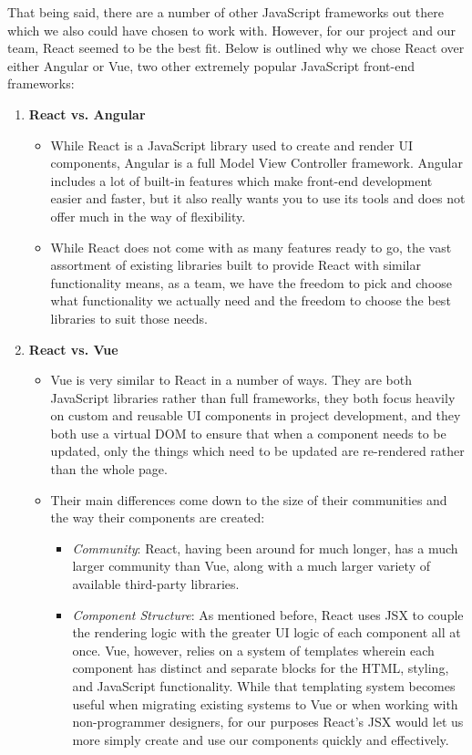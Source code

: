 \documentclass[titlepage, 12pt]{article}
\begin{document}
That being said, there are a number of other JavaScript frameworks out there which we also could have chosen to work with. However, for our project and our team, React seemed to be the best fit. Below is outlined why we chose React over either Angular or Vue, two other extremely popular JavaScript front-end frameworks:

\begin{enumerate}
    \item \textbf{React vs. Angular}
    \begin{itemize}
        \item While React is a JavaScript library used to create and render UI components, Angular is a full Model View Controller framework. Angular includes a lot of built-in features which make front-end development easier and faster, but it also really wants you to use its tools and does not offer much in the way of flexibility.
        \item While React does not come with as many features ready to go, the vast assortment of existing libraries built to provide React with similar functionality means, as a team, we have the freedom to pick and choose what functionality we actually need and the freedom to choose the best libraries to suit those needs.
    \end{itemize}
    \item \textbf{React vs. Vue}
    \begin{itemize}
        \item Vue is very similar to React in a number of ways. They are both JavaScript libraries rather than full frameworks, they both focus heavily on custom and reusable UI components in project development, and they both use a virtual DOM to ensure that when a component needs to be updated, only the things which need to be updated are re-rendered rather than the whole page.
        \item Their main differences come down to the size of their communities and the way their components are created:
        \begin{itemize}
            \item \emph{Community}: React, having been around for much longer, has a much larger community than Vue, along with a much larger variety of available third-party libraries.
            \item \emph{Component Structure}: As mentioned before, React uses JSX to couple the rendering logic with the greater UI logic of each component all at once. Vue, however, relies on a system of templates wherein each component has distinct and separate blocks for the HTML, styling, and JavaScript functionality. While that templating system becomes useful when migrating existing systems to Vue or when working with non-programmer designers, for our purposes React’s JSX would let us more simply create and use our components quickly and effectively.
        \end{itemize}
    \end{itemize}
\end{enumerate}
\end{document}
